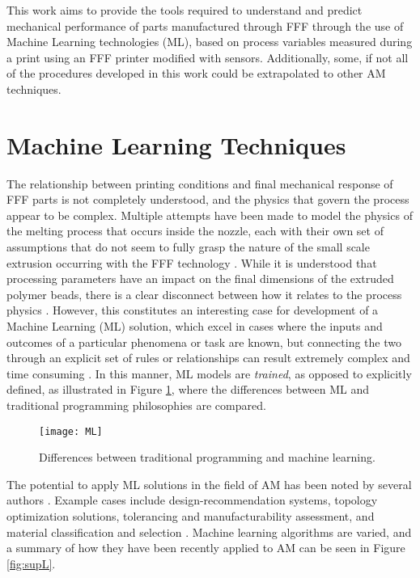 \documentclass[main.tex]{subfiles}
\begin{document}
This work aims to provide the tools required to understand and predict mechanical performance of parts manufactured through FFF through the use of Machine Learning technologies (ML), based on process variables measured during a print using an FFF printer modified with sensors. Additionally, some, if not all of the procedures developed in this work could be extrapolated to other AM techniques.

\section{Machine Learning Techniques} \label{sec:ml}

The relationship between printing conditions and final mechanical response of FFF parts is not completely understood, and the physics that govern the process appear to be complex. Multiple attempts have been made to model the physics of the melting process that occurs inside the nozzle, each with their own set of assumptions that do not seem to fully grasp the nature of the small scale extrusion occurring with the FFF technology \cite{ColonQuintana2020}. While it is understood that processing parameters have an impact on the final dimensions of the extruded polymer beads, there is a clear disconnect between how it relates to the process physics \cite{Koch2017}. However, this constitutes an interesting case for development of a Machine Learning (ML) solution, which excel in cases where the inputs and outcomes of a particular phenomena or task are known, but connecting the two through an explicit set of rules or relationships can result extremely complex and time consuming \cite{Chollet2018}. In this manner, ML models are \emph{trained}, as opposed to explicitly defined, as illustrated in Figure \ref{fig:MLvsP}, where the differences between ML and traditional programming philosophies are compared. 

\begin{figure}[!htbp]
	\center
	\texttt{[image: ML]}
	\caption{Differences between traditional programming and machine learning. \cite{Chollet2018}} \label{fig:MLvsP}
\end{figure}

The potential to apply ML solutions in the field of AM has been noted by several authors \cite{Razvi2019,Meng2020}. Example cases include design-recommendation systems, topology optimization solutions, tolerancing and manufacturability assessment, and material classification and selection \cite{Razvi2019}. Machine learning algorithms are varied, and a summary of how they have been recently applied to AM can be seen in Figure \ref{fig:supL}.
\end{document}
